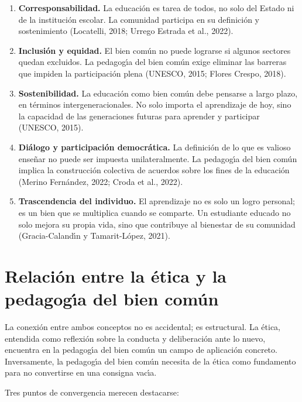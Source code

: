 \documentclass[12pt,letterpaper]{article}
\begin{document}
\begin{enumerate}
  \item \textbf{Corresponsabilidad.} La educaci\'on es tarea de todos, no solo del Estado ni de la instituci\'on escolar. La comunidad participa en su definici\'on y sostenimiento (Locatelli, 2018; Urrego Estrada et al., 2022).
  \item \textbf{Inclusi\'on y equidad.} El bien com\'un no puede lograrse si algunos sectores quedan excluidos. La pedagog\'{\i}a del bien com\'un exige eliminar las barreras que impiden la participaci\'on plena (UNESCO, 2015; Flores Crespo, 2018).
  \item \textbf{Sostenibilidad.} La educaci\'on como bien com\'un debe pensarse a largo plazo, en t\'erminos intergeneracionales. No solo importa el aprendizaje de hoy, sino la capacidad de las generaciones futuras para aprender y participar (UNESCO, 2015).
  \item \textbf{Di\'alogo y participaci\'on democr\'atica.} La definici\'on de lo que es valioso ense\~nar no puede ser impuesta unilateralmente. La pedagog\'{\i}a del bien com\'un implica la construcci\'on colectiva de acuerdos sobre los fines de la educaci\'on (Merino Fern\'andez, 2022; Croda et al., 2022).
  \item \textbf{Trascendencia del individuo.} El aprendizaje no es solo un logro personal; es un bien que se multiplica cuando se comparte. Un estudiante educado no solo mejora su propia vida, sino que contribuye al bienestar de su comunidad (Gracia-Caland\'{\i}n y Tamarit-L\'opez, 2021).
\end{enumerate}

\section{Relaci\'on entre la \'etica y la pedagog\'{\i}a del bien com\'un}

La conexi\'on entre ambos conceptos no es accidental; es estructural. La \'etica, entendida como reflexi\'on sobre la conducta y deliberaci\'on ante lo nuevo, encuentra en la pedagog\'{\i}a del bien com\'un un campo de aplicaci\'on concreto. Inversamente, la pedagog\'{\i}a del bien com\'un necesita de la \'etica como fundamento para no convertirse en una consigna vac\'{\i}a.

Tres puntos de convergencia merecen destacarse:
\end{document}
